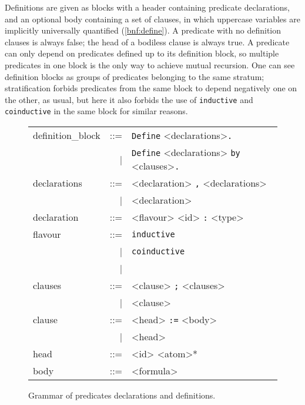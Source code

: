Definitions are given as blocks with a header containing predicate
declarations, and an optional body containing a set of clauses, in which
uppercase variables are implicitly universally quantified
(\autoref{bnf:define}).  A predicate with no definition clauses is
always false; the head of a bodiless clause is always true.  A predicate
can only depend on predicates defined up to its definition block, so
multiple predicates in one block is the only way to achieve mutual
recursion.  One can see definition blocks as groups of predicates
belonging to the same stratum; stratification forbids predicates from
the same block to depend negatively one on the other, as usual, but here
it also forbids the use of \lstinline{inductive} and
\lstinline{coinductive} in the same block for similar reasons.
\begin{figure}[ht]
  \centering
  \begin{tabular}{lrl}
    definition\_block &::=& \lstinline!Define!
                            <declarations>\lstinline!.! \\
                      &  |& \lstinline!Define! <declarations>
                            \lstinline!by! <clauses>\lstinline!.! \\
    declarations      &::=& <declaration> \lstinline!,! <declarations> \\
                      &  |& <declaration>\\
    declaration       &::=& <flavour> <id> \lstinline!:! <type> \\
    flavour           &::=& \lstinline!inductive!\\
                      &  |& \lstinline!coinductive! \\
                      &  |& \\
    clauses           &::=& <clause> \lstinline!;! <clauses> \\
                      &  |& <clause>\\
    clause            &::=& <head> \lstinline!:=! <body> \\
                      &  |& <head> \\
    head              &::=& <id> <atom>* \\
    body              &::=& <formula> \\
  \end{tabular}
  \caption{Grammar of predicates declarations and
    definitions.\label{bnf:define}}
\end{figure}

